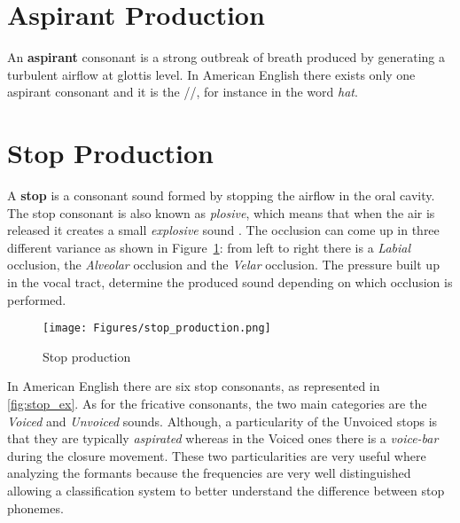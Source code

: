 
\section{Aspirant Production}
\label{sec:Aspirant Production}
An \textbf{aspirant} consonant is a strong outbreak of breath produced by generating a turbulent airflow at glottis level. In American English there exists only one aspirant consonant and it is the //, for instance in the word \textit{hat}.


\section{Stop Production}
\label{sec:Stop Producton}
A \textbf{stop} is a consonant sound formed by stopping the airflow in the oral cavity. The stop consonant is also known as \textit{plosive}, which means that when the air is released it creates a small \textit{explosive} sound \cite{stop_consonants}. The occlusion can come up in three different variance as shown in Figure~\ref{fig:stop_prod}: from left to right there is a \textit{Labial} occlusion, the \textit{Alveolar} occlusion and the \textit{Velar} occlusion. The pressure built up in the vocal tract, determine the produced sound depending on which occlusion is performed.

\begin{figure}[!ht]
    \centering
    \texttt{[image: Figures/stop\_production.png]}
    \caption{Stop production \cite{mit_phonetics}}
    \label{fig:stop_prod}
\end{figure}

\noindent In American English there are six stop consonants, as represented in \ref{fig:stop_ex}. As for the fricative consonants, the two main categories are the \textit{Voiced} and \textit{Unvoiced} sounds. Although, a particularity of the Unvoiced stops is that they are typically \textit{aspirated} whereas in the Voiced ones there is a \textit{voice-bar} during the closure movement. These two particularities are very useful where analyzing the formants because the frequencies are very well distinguished allowing a classification system to better understand the difference between stop phonemes.

